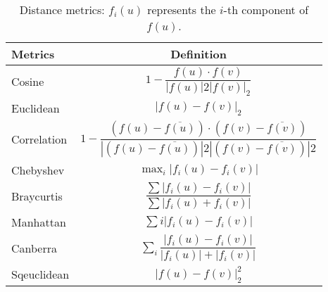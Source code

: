     \begin{table}[!h]
      \centering
      \label{table:distance}
      \footnotesize
      \begin{tabular}{l|c}
        \toprule
        Metrics & Definition \\
        \midrule
        Cosine & $1 - \dfrac{f(u)\cdot f(v)}{\left|f(u)\right|2\left|f(v)\right|_2}$ \\
        Euclidean & $\left|f(u) - f(v)\right|_2$ \\
        Correlation & $1-\dfrac{(f(u)-\overline{f(u)}) \cdot(f(v)-\overline{f(v)})}{|(f(u)-\overline{f(u)})|{2}|(f(v)-\overline{f(v)})|{2}}$ \\
        Chebyshev & $\max _{i}\left|f_i(u)-f_i(v)\right|$ \\
        Braycurtis & $\dfrac{\sum\left|f_i(u)-f_i(v)\right|} {\sum\left|f_i(u)+f_i(v)\right|}$ \\
        Manhattan & $\sum{i}\left|f_i(u)-f_i(v)\right|$ \\
        Canberra & $\sum_{i} \dfrac{\left|f_i(u)-f_i(v)\right|}{\left|f_i(u)\right|+\left|f_i(v)\right|}$ \\
        Sqeuclidean & $\left|f(u) - f(v)\right|_2^2$ \\
        \bottomrule
      \end{tabular}
      \caption{Distance metrics: $f_i(u)$ represents the $i$-th component of $f(u)$.}
    \end{table}

    

    
  